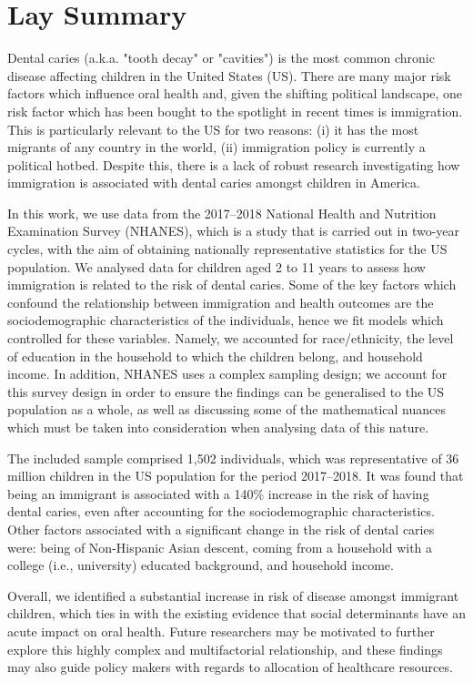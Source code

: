 \chapter{Lay Summary}

Dental caries (a.k.a. "tooth decay" or "cavities") is the most common chronic disease affecting children in the United States (US). There are many major risk factors which influence oral health and, given the shifting political landscape, one risk factor which has been bought to the spotlight in recent times is immigration. This is particularly relevant to the US for two reasons: (i) it has the most migrants of any country in the world, (ii) immigration policy is currently a political hotbed. Despite this, there is a lack of robust research investigating how immigration is associated with dental caries amongst children in America.

In this work, we use data from the 2017--2018 National Health and Nutrition Examination Survey (NHANES), which is a study that is carried out in two-year cycles, with the aim of obtaining nationally representative statistics for the US population. We analysed data for children aged 2 to 11 years to assess how immigration is related to the risk of dental caries. Some of the key factors which confound the relationship between immigration and health outcomes are the sociodemographic characteristics of the individuals, hence we fit models which controlled for these variables. Namely, we accounted for race/ethnicity, the level of education in the household to which the children belong, and household income. In addition, NHANES uses a complex sampling design; we account for this survey design in order to ensure the findings can be generalised to the US population as a whole, as well as discussing some of the mathematical nuances which must be taken into consideration when analysing data of this nature.

The included sample comprised 1,502 individuals, which was representative of 36 million children in the US population for the period 2017--2018. It was found that being an immigrant is associated with a 140\% increase in the risk of having dental caries, even after accounting for the sociodemographic characteristics. Other factors associated with a significant change in the risk of dental caries were: being of Non-Hispanic Asian descent, coming from a household with a college (i.e., university) educated background, and household income.

Overall, we identified a substantial increase in risk of disease amongst immigrant children, which ties in with the existing evidence that social determinants have an acute impact on oral health. Future researchers may be motivated to further explore this highly complex and multifactorial relationship, and these findings may also guide policy makers with regards to allocation of healthcare resources.